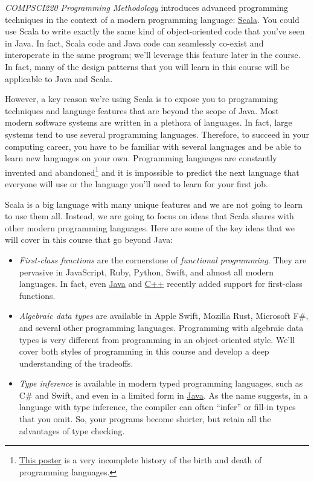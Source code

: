 \documentclass[9pt]{extbook}
\begin{document}
\emph{COMPSCI220 Programming Methodology} introduces advanced programming
techniques in the context of a modern programming language:
\href{http://www.scala-lang.org/}{Scala}.
You could use Scala to write exactly the same kind
of object-oriented code that you've seen in Java. In fact, Scala code and Java
code can seamlessly co-exist and interoperate in the same program; we'll
leverage this feature later in the course. In fact, many of the design patterns
that you will learn in this course will be applicable to Java and Scala.

However, a key reason we're using Scala is to expose you to programming techniques
and language features that are beyond the scope of Java. Most
modern software systems are written in a plethora of languages. In fact, large
systems tend to use several programming languages. Therefore, to succeed in your
computing career, you have to be familiar with several languages and be able to
learn new languages on your own. Programming
languages are constantly invented and abandoned\footnote{\href{http://www.oreillynet.com/pub/a/oreilly/news/languageposter_0504.html}{This poster} is a very incomplete history of the birth and death of programming languages.}
 and it is impossible to predict the next language that everyone
will use or the language you'll need to learn for your first job.

Scala is a big language with many unique features and we are not going to learn
to use them all. Instead, we are going to focus on ideas that Scala shares with
other modern programming languages. Here are some of the key ideas that we will
cover in this course that go beyond Java:
%
\begin{itemize}

\item \emph{First-class functions} are the cornerstone of \emph{functional programming}.
  They are pervasive in JavaScript, Ruby, Python, Swift, and almost all modern
  languages.
  In fact, even \href{{http://docs.oracle.com/javase/tutorial/java/javaOO/lambdaexpressions.html}}{Java} and
  \href{https://docs.microsoft.com/en-us/cpp/cpp/lambda-expressions-in-cpp}{C++} recently
  added support for first-class functions.

\item \emph{Algebraic data types} are available in Apple Swift, Mozilla Rust,
  Microsoft F\#, and several other programming languages. Programming with
  algebraic data types is very different from programming in an object-oriented
  style. We'll cover both styles of programming in this course and develop
  a deep understanding of the tradeoffs.

\item \emph{Type inference} is available in modern typed programming languages,
  such as C\# and Swift, and even in a limited form in
  \href{http://docs.oracle.com/javase/tutorial/java/generics/genTypeInference.html}{Java}.
  As the name suggests, in a language with type inference, the compiler can
  often ``infer'' or fill-in types that you omit. So, your programs become shorter, but
  retain all the advantages of type checking.

\end{itemize}
\end{document}
